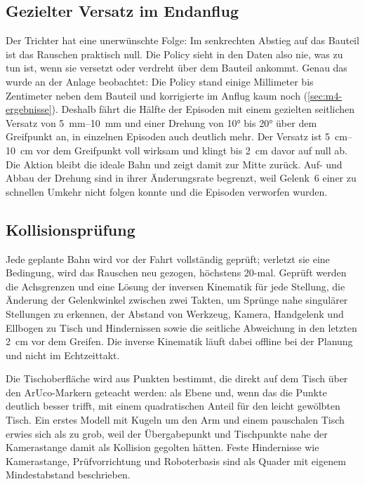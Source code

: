 \subsection{Gezielter Versatz im Endanflug}
\label{sec:m4-versatz}

Der Trichter hat eine unerwünschte Folge: Im senkrechten Abstieg auf das Bauteil ist das
Rauschen praktisch null. Die Policy sieht in den Daten also nie, was zu tun ist, wenn sie
versetzt oder verdreht über dem Bauteil ankommt. Genau das wurde an der Anlage beobachtet: Die
Policy stand einige Millimeter bis Zentimeter neben dem Bauteil und korrigierte im Anflug kaum
noch (\cref{sec:m4-ergebnisse}). Deshalb fährt die Hälfte der Episoden mit einem gezielten
seitlichen Versatz von \SIrange{5}{10}{\milli\metre} und einer Drehung von \ang{10} bis \ang{20}
über dem Greifpunkt an, in einzelnen Episoden auch deutlich mehr. Der Versatz ist
\SIrange{5}{10}{\centi\metre} vor dem Greifpunkt voll wirksam und klingt bis
\SI{2}{\centi\metre} davor auf null ab. Die Aktion bleibt die ideale Bahn und zeigt damit zur
Mitte zurück. Auf- und Abbau der Drehung sind in ihrer Änderungsrate begrenzt, weil Gelenk~6 einer
zu schnellen Umkehr nicht folgen konnte und die Episoden verworfen wurden.

\subsection{Kollisionsprüfung}

Jede geplante Bahn wird vor der Fahrt vollständig geprüft; verletzt sie eine Bedingung, wird das
Rauschen neu gezogen, höchstens 20-mal. Geprüft werden die Achsgrenzen und eine Lösung der
inversen Kinematik für jede Stellung, die Änderung der Gelenkwinkel zwischen zwei Takten, um
Sprünge nahe singulärer Stellungen zu erkennen, der Abstand von Werkzeug, Kamera, Handgelenk und
Ellbogen zu Tisch und Hindernissen sowie die seitliche Abweichung in den letzten
\SI{2}{\centi\metre} vor dem Greifen. Die inverse Kinematik läuft dabei offline bei der Planung
und nicht im Echtzeittakt.

Die Tischoberfläche wird aus Punkten bestimmt, die direkt auf dem Tisch über den ArUco-Markern
geteacht werden: als Ebene und, wenn das die Punkte deutlich besser trifft, mit einem
quadratischen Anteil für den leicht gewölbten Tisch. Ein erstes Modell mit Kugeln um den Arm und
einem pauschalen Tisch erwies sich als zu grob, weil der Übergabepunkt und Tischpunkte nahe der
Kamerastange damit als Kollision gegolten hätten. Feste Hindernisse wie Kamerastange,
Prüfvorrichtung und Roboterbasis sind als Quader mit eigenem Mindestabstand beschrieben.

